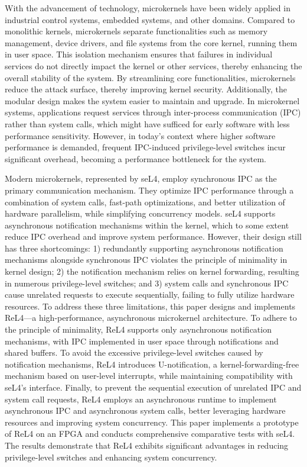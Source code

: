 \begin{englishabstract}
With the advancement of technology, microkernels have been widely applied in industrial control systems, embedded systems, and other domains. Compared to monolithic kernels, microkernels separate functionalities such as memory management, device drivers, and file systems from the core kernel, running them in user space. This isolation mechanism ensures that failures in individual services do not directly impact the kernel or other services, thereby enhancing the overall stability of the system. By streamlining core functionalities, microkernels reduce the attack surface, thereby improving kernel security. Additionally, the modular design makes the system easier to maintain and upgrade. In microkernel systems, applications request services through inter-process communication (IPC) rather than system calls, which might have sufficed for early software with less performance sensitivity. However, in today’s context where higher software performance is demanded, frequent IPC-induced privilege-level switches incur significant overhead, becoming a performance bottleneck for the system.

Modern microkernels, represented by seL4, employ synchronous IPC as the primary communication mechanism. They optimize IPC performance through a combination of system calls, fast-path optimizations, and better utilization of hardware parallelism, while simplifying concurrency models. seL4 supports asynchronous notification mechanisms within the kernel, which to some extent reduce IPC overhead and improve system performance. However, their design still has three shortcomings: 1) redundantly supporting asynchronous notification mechanisms alongside synchronous IPC violates the principle of minimality in kernel design; 2) the notification mechanism relies on kernel forwarding, resulting in numerous privilege-level switches; and 3) system calls and synchronous IPC cause unrelated requests to execute sequentially, failing to fully utilize hardware resources. To address these three limitations, this paper designs and implements ReL4—a high-performance, asynchronous microkernel architecture. To adhere to the principle of minimality, ReL4 supports only asynchronous notification mechanisms, with IPC implemented in user space through notifications and shared buffers. To avoid the excessive privilege-level switches caused by notification mechanisms, ReL4 introduces U-notification, a kernel-forwarding-free mechanism based on user-level interrupts, while maintaining compatibility with seL4’s interface. Finally, to prevent the sequential execution of unrelated IPC and system call requests, ReL4 employs an asynchronous runtime to implement asynchronous IPC and asynchronous system calls, better leveraging hardware resources and improving system concurrency. This paper implements a prototype of ReL4 on an FPGA and conducts comprehensive comparative tests with seL4. The results demonstrate that ReL4 exhibits significant advantages in reducing privilege-level switches and enhancing system concurrency.
   

\end{englishabstract}
